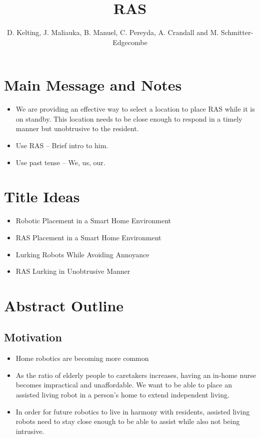 \documentclass[11pt, conference, a4paper]{IEEEtran}
\author{D. Kelting, J. Maliauka, B. Manuel, C. Pereyda, A. Crandall and M. Schmitter-Edgecombe}
\title{RAS}
\begin{document}
\maketitle


\section{Main Message and Notes}
\begin{itemize}
	\item We are providing an effective way to select a location to place RAS while it is on standby. This location needs to be close enough to respond in a timely manner but unobtrusive to the resident.
	\item Use RAS -- Brief intro to him.
	\item Use past tense -- We, us, our.
\end{itemize}


\section{Title Ideas}
\begin{itemize}
	\item Robotic Placement in a Smart Home Environment
	\item RAS Placement in a Smart Home Environment 
	\item Lurking Robots While Avoiding Annoyance
	\item RAS Lurking in Unobtrusive Manner
\end{itemize}


\section{Abstract Outline}


\subsection{Motivation}
\begin{itemize}
    \item Home robotics are becoming more common
    \item As the ratio of elderly people to caretakers increases, having an 
        in-home nurse becomes impractical and unaffordable. We want to be able to place an assisted living robot 
        in a person's home to extend independent living.
    \item In order for future robotics to live in harmony with residents, assisted living robots need to stay close enough to be able to assist while also not being intrusive. 
\end{itemize}
\end{document}
